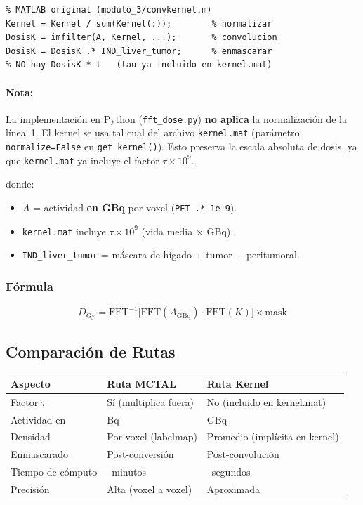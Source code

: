 \documentclass[12pt,a4paper]{article}
\begin{document}
\begin{lstlisting}
% MATLAB original (modulo_3/convkernel.m)
Kernel = Kernel / sum(Kernel(:));        % normalizar
DosisK = imfilter(A, Kernel, ...);       % convolucion
DosisK = DosisK .* IND_liver_tumor;      % enmascarar
% NO hay DosisK * t   (tau ya incluido en kernel.mat)
\end{lstlisting}

\paragraph{Nota:} La implementación en Python (\texttt{fft\_dose.py}) \textbf{no aplica}
la normalización de la línea~1. El kernel se usa tal cual del archivo \texttt{kernel.mat}
(parámetro \texttt{normalize=False} en \texttt{get\_kernel()}). Esto preserva la escala
absoluta de dosis, ya que \texttt{kernel.mat} ya incluye el factor $\tau \times 10^9$.

donde:
\begin{itemize}
  \item $A$ = actividad \textbf{en GBq} por voxel (\texttt{PET .* 1e-9}).
  \item \texttt{kernel.mat} incluye $\tau \times 10^9$ (vida media $\times$ GBq).
  \item \texttt{IND\_liver\_tumor} = máscara de hígado + tumor + peritumoral.
\end{itemize}

\subsubsection{Fórmula}

$$D_{\text{Gy}} = \text{FFT}^{-1}\big[\text{FFT}(A_{\text{GBq}}) \cdot \text{FFT}(K)\big] \times \text{mask}$$


\subsection{Comparación de Rutas}

\begin{tabular}{p{4cm} p{5cm} p{5cm}}
\toprule
\textbf{Aspecto} & \textbf{Ruta MCTAL} & \textbf{Ruta Kernel} \\
\midrule
Factor $\tau$ & Sí (multiplica fuera) & No (incluido en kernel.mat) \\
Actividad en & Bq & GBq \\
Densidad & Por voxel (labelmap) & Promedio (implícita en kernel) \\
Enmascarado & Post-conversión & Post-convolución \\
Tiempo de cómputo & ~minutos & ~segundos \\
Precisión & Alta (voxel a voxel) & Aproximada \\
\bottomrule
\end{tabular}
\end{document}
